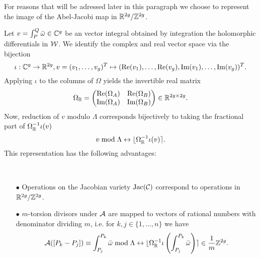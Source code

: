 \documentclass[main.tex]{subfiles}
\begin{document}
   For reasons that will be adressed later in this paragraph
   we choose to
   represent the image of the Abel-Jacobi map in 
    $\mathbb{R}^{2g} / \mathbb{Z}^{2g}$.
    
   Let $v = \int_P^Q \bar{\omega} \in \mathbb{C}^g$ be an vector integral obtained by integration the holomorphic differentials in
   $\mathcal{W}$.
   We identify the complex and real vector space via the bijection
   \begin{equation}
    \iota:\mathbb{C}^g \rightarrow \mathbb{R}^{2g},v = (v_1,\dots,v_g)^T \mapsto (\operatorname{Re}(v_1),\dots,\operatorname{Re}(v_g),\operatorname{Im}(v_1),\dots,\operatorname{Im}(v_g))^T.
   \end{equation}
    Applying $\iota$ to the columns of $\Omega$ yields the invertible real matrix
   \begin{equation}
    \Omega_{\mathbb{R}} = 
   \begin{pmatrix}
     \operatorname{Re}(\Omega_A) & \operatorname{Re}(\Omega_B) \\
     \operatorname{Im}(\Omega_A) & \operatorname{Im}(\Omega_B)
    \end{pmatrix} \in \mathbb{R}^{2g \times 2g}.
   \end{equation}
   Now, reduction of $v$ modulo $\Lambda$ corresponds bijectively to taking the fractional part of $\Omega_{\mathbb{R}}^{-1}\iota(v)$
   \begin{equation}
    v \bmod \Lambda \leftrightarrow \lfloor \Omega_{\mathbb{R}}^{-1}\iota(v) \rceil.
   \end{equation}
   This representation has the following advantages:
   \begin{rmk} \
    \begin{itemize}
     \item[$\bullet$] Operations on the Jacobian variety $\operatorname{Jac}(\mathcal{C})$ correspond to operations in $\mathbb{R}^{2g}/\mathbb{Z}^{2g}$.
     \item[$\bullet$] $m$-torsion divisors under $\mathcal{A}$ are mapped to vectors of rational numbers with 
     denominator dividing $m$, i.e. for $k,j \in \{ 1,\dots,n \}$ we have
     \begin{equation}
      \mathcal{A}([P_k - P_j]) \equiv \int_{P_j}^{P_k} \bar{\omega} \bmod \Lambda \leftrightarrow \lfloor \Omega_{\mathbb{R}}^{-1} \iota\left(\int_{P_j}^{P_k} \bar{\omega}\right)
      \rceil \in \frac{1}m\mathbb{Z}^{2g}.
     \end{equation}
   
    \end{itemize}

    
   \end{rmk}

   
   
   
    

\biblio
\end{document}
